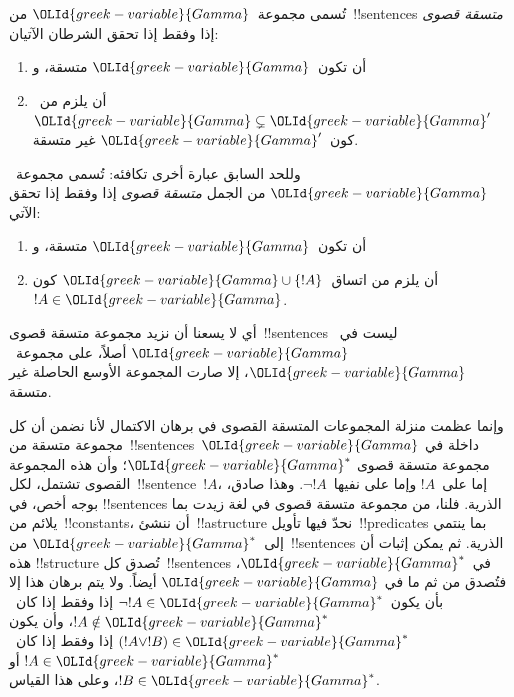 \documentclass[../../../include/open-logic-section]{subfiles}
\begin{document}

\begin{defn}
تُسمى مجموعة~${\OLId{greek-variable}{Gamma}}$ من~!!{sentence}s
\emph{متسقة قصوى} إذا وفقط إذا تحقق الشرطان الآتيان:
\begin{enumerate}
\item أن تكون~${\OLId{greek-variable}{Gamma}}$ متسقة، و
\item أن يلزم من~${\OLId{greek-variable}{Gamma}} \subsetneq {\OLId{greek-variable}{Gamma}}'$ كون~${\OLId{greek-variable}{Gamma}}'$ غير متسقة.
\end{enumerate}
\end{defn}

\begin{explain}
وللحد السابق عبارة أخرى تكافئه: تُسمى مجموعة~${\OLId{greek-variable}{Gamma}}$ من الجمل
\emph{متسقة قصوى} إذا وفقط إذا تحقق الآتي:
\begin{enumerate}
\item أن تكون~${\OLId{greek-variable}{Gamma}}$ متسقة، و
\item أن يلزم من اتساق~${\OLId{greek-variable}{Gamma}} \cup \{ !A \}$ كون~$!A \in {\OLId{greek-variable}{Gamma}}$.
\end{enumerate}
أي لا يسعنا أن نزيد مجموعة متسقة قصوى~!!{sentence}s ليست في~${\OLId{greek-variable}{Gamma}}$
أصلاً، على مجموعة~${\OLId{greek-variable}{Gamma}}$، إلا صارت المجموعة الأوسع الحاصلة غير متسقة.
\end{explain}

\begin{explain}
وإنما عظمت منزلة المجموعات المتسقة القصوى في برهان الاكتمال لأنا نضمن أن
كل مجموعة متسقة من~!!{sentence}s~${\OLId{greek-variable}{Gamma}}$ داخلة في مجموعة متسقة قصوى
${\OLId{greek-variable}{Gamma}}^*$؛ وأن هذه المجموعة القصوى تشتمل، لكل~!!{sentence}~$!A$، إما
على~$!A$ وإما على نفيها~$\lnot !A$. وهذا صادق، بوجه أخص، في
!!{sentence}s الذرية. فلنا، من مجموعة متسقة قصوى في لغة زيدت بما يلائم
من~!!{constant}s، أن ننشئ~!!a{structure} نحدّ فيها تأويل~!!{predicate}s
بما ينتمي إلى~${\OLId{greek-variable}{Gamma}}^*$ من~!!{sentence}s الذرية. ثم يمكن إثبات أن هذه
!!{structure} تُصدق كل~!!{sentence}s في~${\OLId{greek-variable}{Gamma}}^*$، فتُصدق من ثم ما في
${\OLId{greek-variable}{Gamma}}$ أيضاً. ولا يتم برهان هذا إلا بأن يكون~$\lnot !A \in {\OLId{greek-variable}{Gamma}}^*$
إذا وفقط إذا كان~$!A \notin {\OLId{greek-variable}{Gamma}}^*$، وأن يكون
$(!A \lor !B) \in {\OLId{greek-variable}{Gamma}}^*$ إذا وفقط إذا كان~$!A \in {\OLId{greek-variable}{Gamma}}^*$ أو
$!B \in {\OLId{greek-variable}{Gamma}}^*$، وعلى هذا القياس.
\end{explain}
\end{document}
